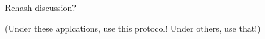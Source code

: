 \documentclass[twocolumn]{article}
\begin{document}
Rehash discussion?

(Under these applcations, use this protocol! Under others, use that!)

\end{document}
